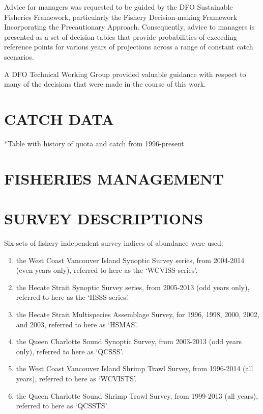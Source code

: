 \documentclass[11pt]{book}\usepackage[]{graphicx}\usepackage[]{color}
\begin{document}
Advice for managers was requested to be guided by the DFO Sustainable Fisheries Framework, particularly the Fishery Decision-making Framework Incorporating the Precautionary Approach. Consequently, advice to managers is presented as a set of decision tables that provide probabilities of exceeding reference points for various years of projections across a range of constant catch scenarios.

A DFO Technical Working Group provided valuable guidance with respect to many of the decisions that were made in the course of this work.

\section{CATCH DATA}
*Table with history of quota and catch from 1996-present

\section{FISHERIES MANAGEMENT}

\clearpage

\section{SURVEY DESCRIPTIONS}

Six sets of fishery independent survey indices of abundance were used:

\begin{enumerate}
  \item the West Coast Vancouver Island Synoptic Survey series, from 2004-2014 (even years only), referred to here as the `WCVISS series'.
  \item the Hecate Strait Synoptic Survey series, from 2005-2013 (odd years only), referred to here as the `HSSS series'.
  \item the Hecate Strait Multispecies Assemblage Survey, for 1996, 1998, 2000, 2002, and 2003, referred to here as `HSMAS'.
  \item the Queen Charlotte Sound Synoptic Survey, from 2003-2013 (odd years only), referred to here as `QCSSS'.
  \item the West Coast Vancouver Island Shrimp Trawl Survey, from 1996-2014 (all years), referred to here as `WCVISTS'.
  \item the Queen Charlotte Sound Shrimp Trawl Survey, from 1999-2013 (all years), referred to here as `QCSSTS'.
\end{enumerate}
\end{document}
